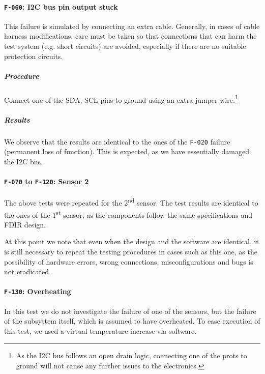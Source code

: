 \documentclass[a4paper,nobib]{tufte-book}
\begin{document}
\FloatBarrier
\paragraph{\textbf{\texttt{F-060}: \acs{I2C} bus pin output stuck}}\hspace{0pt}

This failure is simulated by connecting an extra cable. Generally, in cases of cable harness modifications, care must be taken so that connections that can harm the test system (e.g. short circuits) are avoided, especially if there are no suitable protection circuits.

\subparagraph{Procedure}
\begin{compactenum}
	\item Connect one of the \acs{SDA}, \acs{SCL} pins to ground using an extra jumper wire.\footnote{As the \acs{I2C} bus follows an open drain logic, connecting one of the prots to ground will not cause any further issues to the electronics.}
\end{compactenum}

\subparagraph{Results}
We observe that the results are identical to the ones of the \texttt{F-020} failure (permanent loss of function). This is expected, as we have essentially damaged the \acs{I2C} bus.

\paragraph{\textbf{\texttt{F-070} to \texttt{F-120}: Sensor 2}}\hspace{0pt}

The above tests were repeated for the 2\textsuperscript{nd} sensor. The test results are identical to the ones of the 1\textsuperscript{st} sensor, as the components follow the same specifications and \acs{FDIR} design.

At this point we note that even when the design and the software are identical, it is still necessary to repeat the testing procedures in cases such as this one, as the possibility of hardware errors, wrong connections, misconfigurations and bugs is not eradicated.

\clearpage
\paragraph{\textbf{\texttt{F-130}: Overheating}}\hspace{0pt}

In this test we do not investigate the failure of one of the sensors, but the failure of the subsystem itself, which is assumed to have overheated. To ease execution of this test, we used a virtual temperature increase via software.
\end{document}
